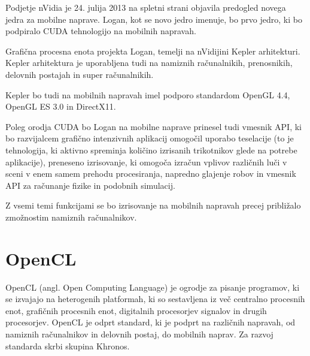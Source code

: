 


Podjetje nVidia je 24. julija 2013 \cite{cuda-mobile} na spletni strani objavila predogled novega jedra za mobilne naprave. Logan, kot se novo jedro imenuje, bo prvo jedro, ki bo podpiralo CUDA tehnologijo na mobilnih napravah.

Grafična procesna enota projekta Logan, temelji na nVidijini Kepler arhitekturi. Kepler arhitektura je uporabljena tudi na namiznih računalnikih, prenosnikih, delovnih postajah in super računalnikih.

Kepler bo tudi na mobilnih napravah imel podporo standardom OpenGL 4.4, OpenGL ES 3.0 in DirectX11.

Poleg orodja CUDA bo Logan na mobilne naprave prinesel tudi vmesnik API, ki bo razvijalcem grafično intenzivnih aplikacij omogočil uporabo teselacije (to je tehnologija, ki aktivno spreminja količino izrisanih trikotnikov glede na potrebe aplikacije), preneseno izrisovanje, ki omogoča izračun vplivov različnih luči v sceni v enem samem prehodu procesiranja, napredno glajenje robov in vmesnik API za računanje fizike in podobnih simulacij.

Z vsemi temi funkcijami se bo izrisovanje na mobilnih napravah precej približalo zmožnostim namiznih računalnikov. 
 

\section{OpenCL}

OpenCL (angl. Open Computing Language) \cite{opencl} je ogrodje za pisanje programov, ki se izvajajo na heterogenih platformah, ki so sestavljena iz več centralno procesnih enot, grafičnih procesnih enot, digitalnih procesorjev signalov in drugih procesorjev. OpenCL je odprt standard, ki je podprt na različnih napravah, od namiznih računalnikov in delovnih postaj, do mobilnih naprav. Za razvoj standarda skrbi skupina Khronos.

